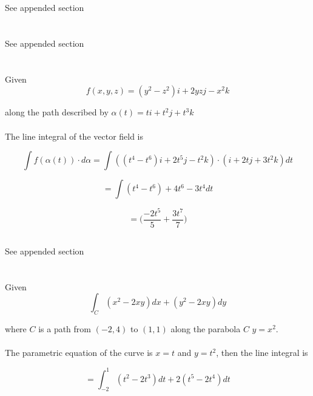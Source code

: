 \documentclass[11pt]{article}
\begin{document}
\section{}
See appended section
\section{}
See appended section
\section{}

\subsection{}

Given $$f(x,y,z) = (y^{2} − z^{2})i + 2yzj − x^{2}k$$

along the path described by $\alpha(t) = ti + t^{2}j + t^{3}k$
\\
\\
The line integral of the vector field is

$$\int{f(\alpha(t))}\cdot{d\alpha} = \int {((t^{4} − t^{6})i + 2t^{5}j − t^{2}k)}\cdot{(i + 2tj + 3t^{2}k)}dt$$

$$= \int{(t^{4} - t^{6}) + 4t^{6} - 3t^{4}}dt$$

$$= \Big(\frac{-2t^{5}}{5} + \frac{3t^{7}}{7}\Big)$$

\subsection{}

See appended section

\section{}

\subsection{}

Given $$\int_{C}(x^{2} - 2xy)dx + (y^{2} - 2xy)dy$$

where $C$ is a path from $(−2,4)$ to $(1,1)$ along the parabola $C$ $y = x^{2}$.
\\
\\
The parametric equation of the curve is $x = t$ and $y = t^{2}$, then the line integral is

$$= \int_{-2}^{1}(t^{2} - 2t^{3})dt + 2(t^{5} - 2t^{4})dt$$
\end{document}
